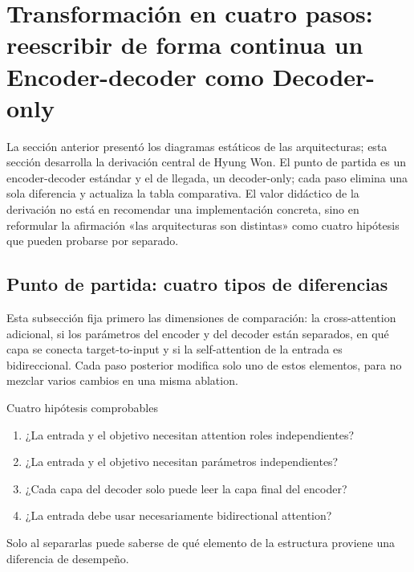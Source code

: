 \section{Transformación en cuatro pasos: reescribir de forma continua un Encoder-decoder como Decoder-only}

La sección anterior presentó los diagramas estáticos de las arquitecturas; esta sección desarrolla la derivación central de Hyung Won. El punto de partida es un encoder-decoder estándar y el de llegada, un decoder-only; cada paso elimina una sola diferencia y actualiza la tabla comparativa. El valor didáctico de la derivación no está en recomendar una implementación concreta, sino en reformular la afirmación «las arquitecturas son distintas» como cuatro hipótesis que pueden probarse por separado.

\subsection{Punto de partida: cuatro tipos de diferencias}

Esta subsección fija primero las dimensiones de comparación: la cross-attention adicional, si los parámetros del encoder y del decoder están separados, en qué capa se conecta target-to-input y si la self-attention de la entrada es bidireccional. Cada paso posterior modifica solo uno de estos elementos, para no mezclar varios cambios en una misma ablation.


\begin{importantbox}{Cuatro hipótesis comprobables}
\begin{enumerate}
  \item ¿La entrada y el objetivo necesitan attention roles independientes?
  \item ¿La entrada y el objetivo necesitan parámetros independientes?
  \item ¿Cada capa del decoder solo puede leer la capa final del encoder?
  \item ¿La entrada debe usar necesariamente bidirectional attention?
\end{enumerate}
Solo al separarlas puede saberse de qué elemento de la estructura proviene una diferencia de desempeño.
\end{importantbox}

